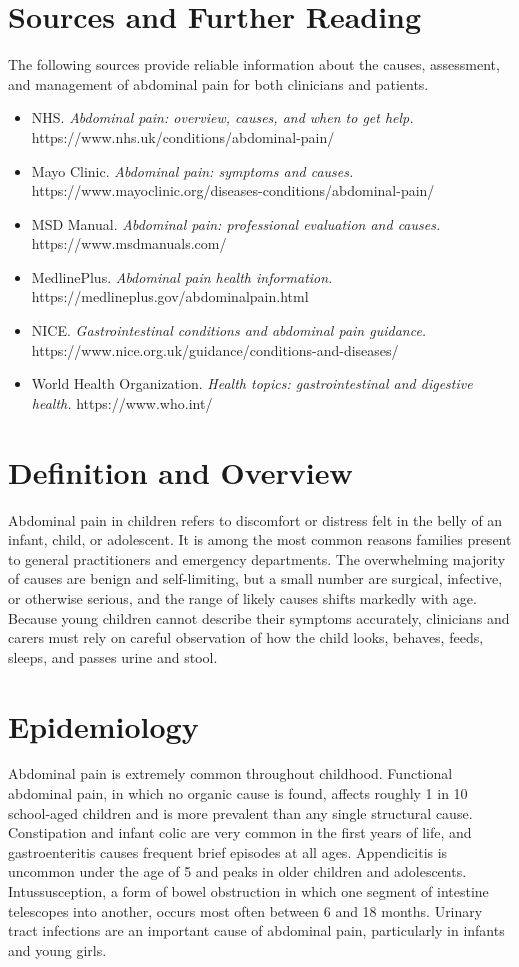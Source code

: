 \section*{Sources and Further Reading}
The following sources provide reliable information about the causes, assessment, and management of abdominal pain for both clinicians and patients.

\begin{itemize}
    \item NHS. \textit{Abdominal pain: overview, causes, and when to get help.} https://www.nhs.uk/conditions/abdominal-pain/
    \item Mayo Clinic. \textit{Abdominal pain: symptoms and causes.} https://www.mayoclinic.org/diseases-conditions/abdominal-pain/
    \item MSD Manual. \textit{Abdominal pain: professional evaluation and causes.} https://www.msdmanuals.com/
    \item MedlinePlus. \textit{Abdominal pain health information.} https://medlineplus.gov/abdominalpain.html
    \item NICE. \textit{Gastrointestinal conditions and abdominal pain guidance.} https://www.nice.org.uk/guidance/conditions-and-diseases/
    \item World Health Organization. \textit{Health topics: gastrointestinal and digestive health.} https://www.who.int/
\end{itemize}

\section*{Definition and Overview}
Abdominal pain in children refers to discomfort or distress felt in the belly of an infant, child, or adolescent. It is among the most common reasons families present to general practitioners and emergency departments. The overwhelming majority of causes are benign and self-limiting, but a small number are surgical, infective, or otherwise serious, and the range of likely causes shifts markedly with age. Because young children cannot describe their symptoms accurately, clinicians and carers must rely on careful observation of how the child looks, behaves, feeds, sleeps, and passes urine and stool.

\section*{Epidemiology}
Abdominal pain is extremely common throughout childhood. Functional abdominal pain, in which no organic cause is found, affects roughly 1 in 10 school-aged children and is more prevalent than any single structural cause. Constipation and infant colic are very common in the first years of life, and gastroenteritis causes frequent brief episodes at all ages. Appendicitis is uncommon under the age of 5 and peaks in older children and adolescents. Intussusception, a form of bowel obstruction in which one segment of intestine telescopes into another, occurs most often between 6 and 18 months. Urinary tract infections are an important cause of abdominal pain, particularly in infants and young girls.

